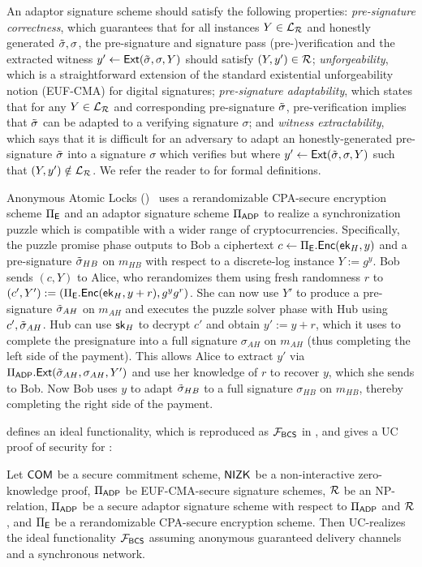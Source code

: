 An adaptor signature scheme should satisfy the following properties: \emph{pre-signature correctness}, which guarantees that for all instances $Y \in \mathcal{L}_{\mathcal{R}}$ and honestly generated $\tilde{\sigma}, \sigma$, the pre-signature and signature pass (pre-)verification and the extracted witness $y' \gets \mathsf{Ext}(\tilde{\sigma}, \sigma, Y)$ should satisfy $(Y, y') \in \mathcal{R}$; \emph{unforgeability}, which is a straightforward extension of the standard existential unforgeability notion (EUF-CMA) for digital signatures; \emph{pre-signature adaptability}, which states that for any $Y \in \mathcal{L}_{\mathcal{R}}$ and corresponding pre-signature $\tilde{\sigma}$, pre-verification implies that $\tilde{\sigma}$ can be adapted to a verifying signature $\sigma$; and \emph{witness extractability}, which says that it is difficult for an adversary to adapt an honestly-generated pre-signature $\tilde{\sigma}$ into a signature $\sigma$ which verifies but where $y' \gets \mathsf{Ext}(\tilde{\sigma}, \sigma, Y)$ such that $(Y, y') \notin \mathcal{L}_{\mathcal{R}}$. We refer the reader to \cite{CCS:GMMMTT22} for formal definitions.

Anonymous Atomic Locks (\AAL)~\cite{SP:TaiMorMaf21} uses a rerandomizable CPA-secure encryption scheme $\Pi_{\mathsf{E}}$ and an adaptor signature scheme $\Pi_{\mathsf{ADP}}$ to realize a synchronization puzzle which is compatible with a wider range of cryptocurrencies. Specifically, the puzzle promise phase outputs to Bob a ciphertext $c \gets \Pi_{\mathsf{E}}.\mathsf{Enc}(\mathsf{ek}_H, y)$ and a pre-signature $\tilde{\sigma}_{HB}$ on $m_{HB}$ with respect to a discrete-log instance $Y := g^y$. Bob sends $(c, Y)$ to Alice, who rerandomizes them using fresh randomness $r$ to $(c', Y') := (\Pi_{\mathsf{E}}.\mathsf{Enc}(\mathsf{ek}_H, y+r), g^y g^r)$. She can now use $Y'$ to produce a pre-signature $\tilde{\sigma}_{AH}$ on $m_{AH}$ and executes the puzzle solver phase with Hub using $c', \tilde{\sigma}_{AH}$. Hub can use $\mathsf{sk}_H$ to decrypt $c'$ and obtain $y' := y+r$, which it uses to complete the presignature into a full signature $\sigma_{AH}$ on $m_{AH}$ (thus completing the left side of the payment). This allows Alice to extract $y'$ via $\Pi_{\mathsf{ADP}}.\mathsf{Ext}(\tilde{\sigma}_{AH}, \sigma_{AH}, Y')$ and use her knowledge of $r$ to recover $y$, which she sends to Bob. Now Bob uses $y$ to adapt $\tilde{\sigma}_{HB}$ to a full signature $\sigma_{HB}$ on $m_{HB}$, thereby completing the right side of the payment.

\cite{SP:TaiMorMaf21} defines an ideal functionality, which is reproduced as $\mathcal{F}_{\mathsf{BCS}}$ in \cite{CCS:GMMMTT22}, and gives a UC proof of security for \AAL:

\begin{theorem}\label{thm:a2l}
    Let $\sf COM$ be a secure commitment scheme, $\mathsf{NIZK}$ be a non-interactive zero-knowledge proof, $\Pi_{\mathsf{ADP}}$ be EUF-CMA-secure signature schemes, $\mathcal{R}$ be an NP-relation, $\Pi_{\mathsf{ADP}}$ be a secure adaptor signature scheme with respect to $\Pi_{\mathsf{ADP}}$ and $\mathcal{R}$, and $\Pi_{\mathsf{E}}$ be a rerandomizable CPA-secure encryption scheme. Then \AAL UC-realizes the ideal functionality $\mathcal{F}_{\mathsf{BCS}}$ assuming anonymous guaranteed delivery channels and a synchronous network.
\end{theorem}

